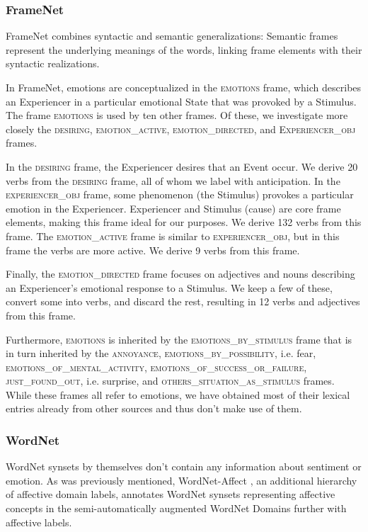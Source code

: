 \subsubsection{FrameNet}

FrameNet \cite{framenet} combines syntactic and semantic generalizations: Semantic frames represent the underlying meanings of the words, linking frame elements with their syntactic realizations.

In FrameNet, emotions are conceptualized in the \textsc{emotions} frame, which describes an Experiencer in a particular emotional State that was provoked by a Stimulus. The frame \textsc{emotions} is used by ten other frames. Of these, we investigate more closely the \textsc{desiring}, \textsc{emotion\_active}, \textsc{emotion\_directed}, and \textsc{Experiencer\_obj} frames.

In the \textsc{desiring} frame, the Experiencer desires that an Event occur. We derive 20 verbs from the \textsc{desiring} frame, all of whom we label with anticipation. In the \textsc{experiencer\_obj} frame, some phenomenon (the Stimulus) provokes a particular emotion in the Experiencer. Experiencer and Stimulus (cause) are core frame elements, making this frame ideal for our purposes. We derive 132 verbs from this frame. The \textsc{emotion\_active} frame is similar to \textsc{experiencer\_obj}, but in this frame the verbs are more active. We derive 9 verbs from this frame.

Finally, the \textsc{emotion\_directed} frame focuses on adjectives and nouns describing an Experiencer's emotional response to a Stimulus. We keep a few of these, convert some into verbs, and discard the rest, resulting in 12 verbs and adjectives from this frame.

Furthermore, \textsc{emotions} is inherited by the \textsc{emotions\_by\_stimulus} frame that is in turn inherited by the \textsc{annoyance}, \textsc{emotions\_by\_possibility}, i.e. fear, \textsc{emotions\_of\_mental\_activity}, \textsc{emotions\_of\_success\_or\_failure}, \textsc{just\_found\_out}, i.e. surprise, and \textsc{others\_situation\_as\_stimulus} frames.
While these frames all refer to emotions, we have obtained most of their lexical entries already from other sources and thus don't make use of them.

\subsubsection{WordNet}

WordNet \cite{wordnet} synsets by themselves don't contain any information about sentiment or emotion. As was previously mentioned, WordNet-Affect \cite{wordnet-affect}, an additional hierarchy of affective domain labels, annotates WordNet synsets representing affective concepts in the semi-automatically augmented WordNet Domains further with affective labels.

